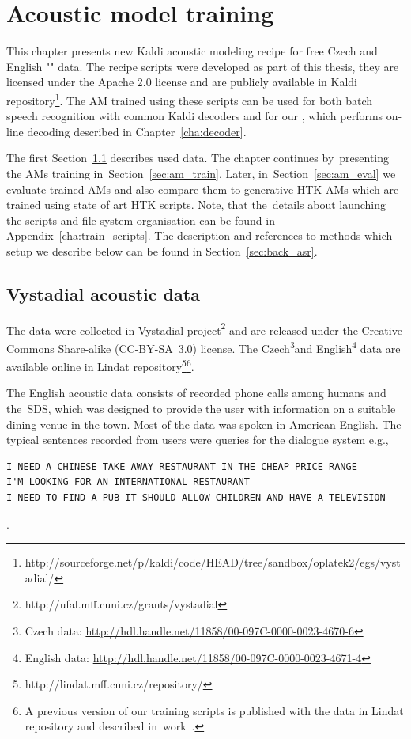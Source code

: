 \chapter{Acoustic model training}
\label{cha:train}

This chapter presents new Kaldi acoustic modeling recipe for free Czech and English "" data.
The recipe scripts were developed as part of this thesis, they are licensed under the Apache 2.0 license and are publicly available in Kaldi repository\footnote{http://sourceforge.net/p/kaldi/code/HEAD/tree/sandbox/oplatek2/egs/vystadial/}.
The \ac{AM} trained using these scripts can be used for both batch speech recognition with common Kaldi decoders and for our , which performs on-line decoding described in Chapter~\ref{cha:decoder}.

The first Section~\ref{sec:data} describes used data. 
The chapter continues by~presenting the \acp{AM} training in~Section~\ref{sec:am_train}. 
Later, in~Section~\ref{sec:am_eval} we evaluate trained \acp{AM} and also compare them to generative \ac{HTK} \acp{AM} which are trained using state of art \ac{HTK} scripts.
Note, that the~details about launching the scripts and file system organisation can be found in Appendix~\ref{cha:train_scripts}.  
The description and references to methods which setup we describe below can be found in Section~\ref{sec:back_asr}.

\section{Vystadial acoustic data}
\label{sec:data}

The data were collected in Vystadial project\footnote{http://ufal.mff.cuni.cz/grants/vystadial} and are released under the Creative Commons Share-alike (CC-BY-SA~3.0) license. 
The Czech\footnote{Czech data: \url{http://hdl.handle.net/11858/00-097C-0000-0023-4670-6}}and English\footnote{English data: \url{http://hdl.handle.net/11858/00-097C-0000-0023-4671-4}} data are available online in Lindat repository\footnote{{http://lindat.mff.cuni.cz/repository/}}\footnote{A previous version of our training scripts is published with the data in Lindat repository and described in~work~\cite{korvas_2014}.}.

The English acoustic data consists of recorded phone calls among humans and the~\acl{SDS}, which was designed to provide the user with information on a suitable dining venue in the town.
Most of the data was spoken in American English.
The typical sentences recorded from users were queries for the dialogue system e.g.,
\begin{verbatim}
I NEED A CHINESE TAKE AWAY RESTAURANT IN THE CHEAP PRICE RANGE
I'M LOOKING FOR AN INTERNATIONAL RESTAURANT
I NEED TO FIND A PUB IT SHOULD ALLOW CHILDREN AND HAVE A TELEVISION
\end{verbatim}.

